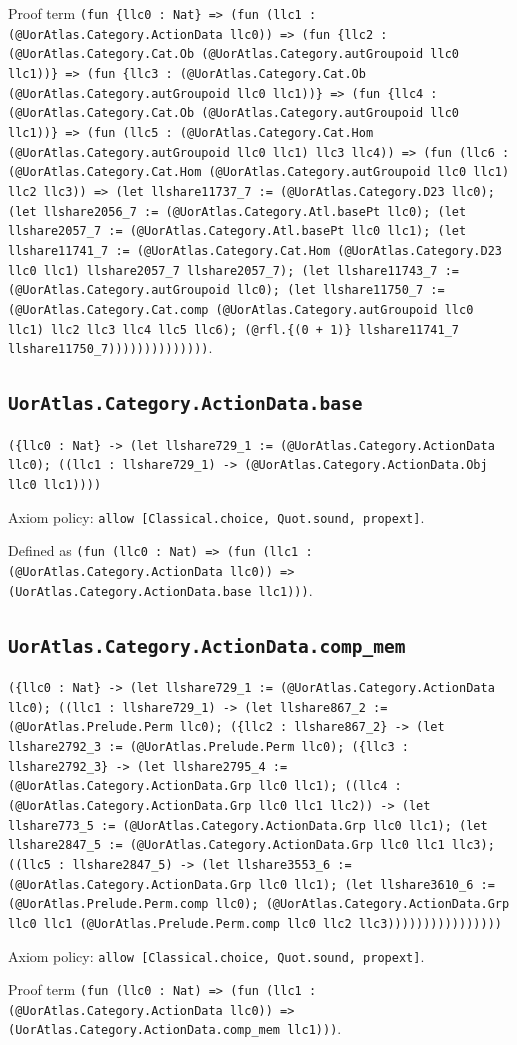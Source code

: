 \documentclass[11pt]{article}
\begin{document}
\noindent Proof term \texttt{(fun \{llc0 : Nat\} => (fun (llc1 : (@UorAtlas.Category.ActionData llc0)) => (fun \{llc2 : (@UorAtlas.Category.Cat.Ob (@UorAtlas.Category.autGroupoid llc0 llc1))\} => (fun \{llc3 : (@UorAtlas.Category.Cat.Ob (@UorAtlas.Category.autGroupoid llc0 llc1))\} => (fun \{llc4 : (@UorAtlas.Category.Cat.Ob (@UorAtlas.Category.autGroupoid llc0 llc1))\} => (fun (llc5 : (@UorAtlas.Category.Cat.Hom (@UorAtlas.Category.autGroupoid llc0 llc1) llc3 llc4)) => (fun (llc6 : (@UorAtlas.Category.Cat.Hom (@UorAtlas.Category.autGroupoid llc0 llc1) llc2 llc3)) => (let llshare11737\_7 := (@UorAtlas.Category.D23 llc0); (let llshare2056\_7 := (@UorAtlas.Category.Atl.basePt llc0); (let llshare2057\_7 := (@UorAtlas.Category.Atl.basePt llc0 llc1); (let llshare11741\_7 := (@UorAtlas.Category.Cat.Hom (@UorAtlas.Category.D23 llc0 llc1) llshare2057\_7 llshare2057\_7); (let llshare11743\_7 := (@UorAtlas.Category.autGroupoid llc0); (let llshare11750\_7 := (@UorAtlas.Category.Cat.comp (@UorAtlas.Category.autGroupoid llc0 llc1) llc2 llc3 llc4 llc5 llc6); (@rfl.\{(0 + 1)\} llshare11741\_7 llshare11750\_7))))))))))))))}.\par
\subsection*{\texttt{UorAtlas.Category.ActionData.base}}
\noindent\texttt{(\{llc0 : Nat\} -> (let llshare729\_1 := (@UorAtlas.Category.ActionData llc0); ((llc1 : llshare729\_1) -> (@UorAtlas.Category.ActionData.Obj llc0 llc1))))}\par
\noindent Axiom policy: \texttt{allow [Classical.choice, Quot.sound, propext]}.\par
\noindent Defined as \texttt{(fun (llc0 : Nat) => (fun (llc1 : (@UorAtlas.Category.ActionData llc0)) => (UorAtlas.Category.ActionData.base llc1)))}.\par
\subsection*{\texttt{UorAtlas.Category.ActionData.comp\_mem}}
\noindent\texttt{(\{llc0 : Nat\} -> (let llshare729\_1 := (@UorAtlas.Category.ActionData llc0); ((llc1 : llshare729\_1) -> (let llshare867\_2 := (@UorAtlas.Prelude.Perm llc0); (\{llc2 : llshare867\_2\} -> (let llshare2792\_3 := (@UorAtlas.Prelude.Perm llc0); (\{llc3 : llshare2792\_3\} -> (let llshare2795\_4 := (@UorAtlas.Category.ActionData.Grp llc0 llc1); ((llc4 : (@UorAtlas.Category.ActionData.Grp llc0 llc1 llc2)) -> (let llshare773\_5 := (@UorAtlas.Category.ActionData.Grp llc0 llc1); (let llshare2847\_5 := (@UorAtlas.Category.ActionData.Grp llc0 llc1 llc3); ((llc5 : llshare2847\_5) -> (let llshare3553\_6 := (@UorAtlas.Category.ActionData.Grp llc0 llc1); (let llshare3610\_6 := (@UorAtlas.Prelude.Perm.comp llc0); (@UorAtlas.Category.ActionData.Grp llc0 llc1 (@UorAtlas.Prelude.Perm.comp llc0 llc2 llc3))))))))))))))))}\par
\noindent Axiom policy: \texttt{allow [Classical.choice, Quot.sound, propext]}.\par
\noindent Proof term \texttt{(fun (llc0 : Nat) => (fun (llc1 : (@UorAtlas.Category.ActionData llc0)) => (UorAtlas.Category.ActionData.comp\_mem llc1)))}.\par
\end{document}
